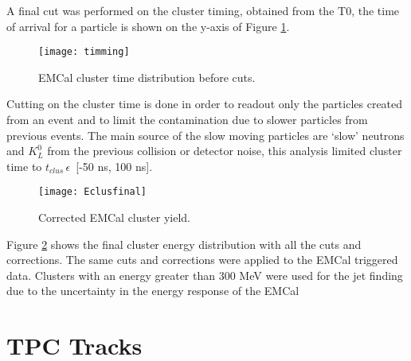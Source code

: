 A final cut was performed on the cluster timing, obtained from the T0, the time of arrival for a particle is shown on the y-axis of Figure \ref{fig:EMCaltime}.  

\begin{figure}[!h]
\texttt{[image: timming]}
\centering
\caption{EMCal cluster time distribution before cuts.}
\label{fig:EMCaltime}
\end{figure}


Cutting on the cluster time is done in order to readout only the particles created from an event and to limit the contamination due to slower particles from previous events.  The main source of the slow moving particles are `slow' neutrons and $K_{L}^{0}$ from the previous collision or detector noise, this analysis limited cluster time to $t_{clus} \, \epsilon \,$ [-50 ns, 100 ns].


\begin{figure}[h]
\texttt{[image: Eclusfinal]}
\centering
\caption{Corrected EMCal cluster yield.}
\label{fig:EMCalfinal}
\end{figure}
\newpage

Figure \ref{fig:EMCalfinal} shows the final cluster energy distribution with all the cuts and corrections.  The same cuts and corrections were applied to the EMCal triggered data.  Clusters with an energy greater than 300 MeV were used for the jet finding due to the uncertainty in the energy response of the EMCal

\section{TPC Tracks}

